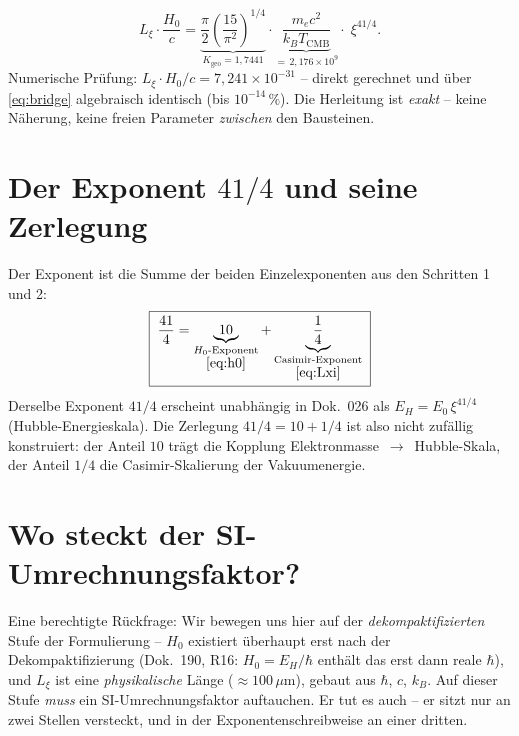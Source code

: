 \begin{keyresult}
\begin{equation}
  L_\xi\cdot\frac{H_0}{c}
  = \underbrace{\frac{\pi}{2}\left(\frac{15}{\pi^2}\right)^{1/4}}_{K_\text{geo}=1{,}7441}
  \cdot
  \underbrace{\frac{m_ec^2}{k_BT_\text{CMB}}}_{=\,2{,}176\times10^{9}}
  \cdot\;\xi^{41/4}.
  \label{eq:bridge}
\end{equation}
Numerische Prüfung: $L_\xi\cdot H_0/c = 7{,}241\times10^{-31}$ -- direkt
gerechnet und über \eqref{eq:bridge} algebraisch identisch (bis $10^{-14}\,\%$).
Die Herleitung ist \emph{exakt} -- keine Näherung, keine freien Parameter
\emph{zwischen} den Bausteinen.
\end{keyresult}

\section{Der Exponent $41/4$ und seine Zerlegung}

Der Exponent ist die Summe der beiden Einzelexponenten aus den Schritten 1 und 2:
\begin{equation}
  \boxed{\;\frac{41}{4}
  = \underbrace{10}_{\substack{H_0\text{-Exponent}\\ \eqref{eq:h0}}}
  + \underbrace{\frac14}_{\substack{\text{Casimir-Exponent}\\ \eqref{eq:Lxi}}}\;}
  \label{eq:decomp}
\end{equation}
Derselbe Exponent $41/4$ erscheint unabhängig in Dok.~026 als
$E_H = E_0\,\xi^{41/4}$ (Hubble-Energieskala). Die Zerlegung $41/4=10+1/4$ ist
also nicht zufällig konstruiert: der Anteil $10$ trägt die Kopplung
Elektronmasse~$\to$~Hubble-Skala, der Anteil $1/4$ die Casimir-Skalierung der
Vakuumenergie.

\section{Wo steckt der SI-Umrechnungsfaktor?}

Eine berechtigte Rückfrage: Wir bewegen uns hier auf der \emph{dekompaktifizierten}
Stufe der Formulierung -- $H_0$ existiert überhaupt erst nach der
Dekompaktifizierung (Dok.~190, R16: $H_0 = E_H/\hbar$ enthält das erst dann
reale $\hbar$), und $L_\xi$ ist eine \emph{physikalische} Länge ($\approx
100\,\mu$m), gebaut aus $\hbar$, $c$, $k_B$. Auf dieser Stufe \emph{muss} ein
SI-Umrechnungsfaktor auftauchen. Er tut es auch -- er sitzt nur an zwei Stellen
versteckt, und in der Exponentenschreibweise an einer dritten.

